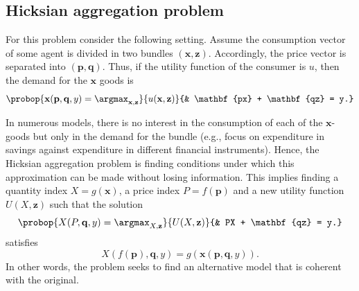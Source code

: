\documentclass[english, a4paper,12pt]{article}
\begin{document}
\subsection{Hicksian aggregation problem} \label{ssec:HicksAgg}
For this problem consider the following setting. Assume the consumption vector of some agent is divided in two bundles $(\mathbf{x}, \mathbf{z})$. Accordingly, the price vector is separated into $(\mathbf{p}, \mathbf{q})$. Thus, if the utility function of the consumer is $u$, then the demand for the $\mathbf{x}$ goods is
	\begin{equation} \label{eq:hickdisprob}
		\probop{\mathbf{x}(\mathbf{p}, \mathbf{q}, y) = \argmax_{\mathbf{x}, \mathbf{z}}}{u(\mathbf{x}, \mathbf{z})}
					{&	\mathbf{px} + \mathbf{qz} = y.}
	\end{equation}

In numerous models, there is no interest in the consumption of each of the $\mathbf{x}$-goods but only in the demand for the bundle (e.g., focus on expenditure in savings against expenditure in different financial instruments). Hence, the Hicksian aggregation problem is finding conditions under which this approximation can be made without losing information. This implies finding a quantity index $X = g(\mathbf{x})$, a price index $P = f(\mathbf{p})$ and a new utility function $U(X, \mathbf{z})$ such that the solution 
	 \begin{equation} \label{eq:hickaggprob}
		\probop{X(P, \mathbf{q}, y) = \argmax_{X, \mathbf{z}}}{U(X, \mathbf{z})}
					{&	PX + \mathbf{qz} = y.}
	\end{equation}
satisfies
	$$X(f(\mathbf{p}), \mathbf{q}, y) = g(\mathbf{x}(\mathbf{p}, \mathbf{q}, y)).$$
In other words, the problem seeks to find an alternative model that is coherent with the original. 
\end{document}
